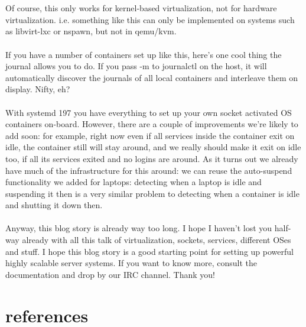 \documentclass[titlepage]{article}
\begin{document}
\\
\\
Of course, this only works for kernel-based virtualization, not for hardware virtualization. i.e. something like this can only be implemented on systems such as libvirt-lxc or nspawn, but not in qemu/kvm.
\\
\\
If you have a number of containers set up like this, here's one cool thing the journal allows you to do. If you pass -m to journalctl on the host, it will automatically discover the journals of all local containers and interleave them on display. Nifty, eh?
\\
\\
With systemd 197 you have everything to set up your own socket activated OS containers on-board. However, there are a couple of improvements we're likely to add soon: for example, right now even if all services inside the container exit on idle, the container still will stay around, and we really should make it exit on idle too, if all its services exited and no logins are around. As it turns out we already have much of the infrastructure for this around: we can reuse the auto-suspend functionality we added for laptops: detecting when a laptop is idle and suspending it then is a very similar problem to detecting when a container is idle and shutting it down then.
\\
\\
Anyway, this blog story is already way too long. I hope I haven't lost you half-way already with all this talk of virtualization, sockets, services, different OSes and stuff. I hope this blog story is a good starting point for setting up powerful highly scalable server systems. If you want to know more, consult the documentation and drop by our IRC channel. Thank you!
\section{references}
\nocite{*}


\end{document}
